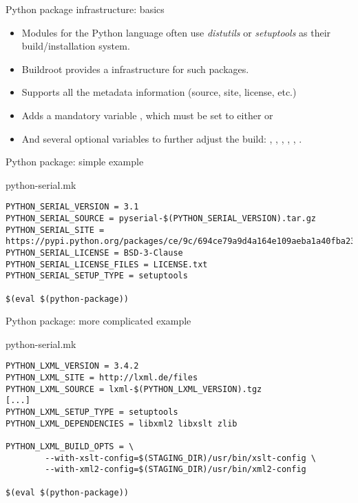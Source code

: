 \begin{frame}{Python package infrastructure: basics}
  \begin{itemize}
  \item Modules for the Python language often use {\em distutils} or
    {\em setuptools} as their build/installation system.
  \item Buildroot provides a  infrastructure for
    such packages.
  \item Supports all the  metadata information
    (source, site, license, etc.)
  \item Adds a mandatory variable , which must
    be set to either  or 
  \item And several optional variables to further adjust the build:
    , ,
    ,
    , ,
    .
  \end{itemize}
\end{frame}

\begin{frame}[fragile]{Python package: simple example}

  \begin{block}{python-serial.mk}
    \begin{verbatim}
PYTHON_SERIAL_VERSION = 3.1
PYTHON_SERIAL_SOURCE = pyserial-$(PYTHON_SERIAL_VERSION).tar.gz
PYTHON_SERIAL_SITE = https://pypi.python.org/packages/ce/9c/694ce79a9d4a164e109aeba1a40fba23336f3b7554978553e22a5d41d54d
PYTHON_SERIAL_LICENSE = BSD-3-Clause
PYTHON_SERIAL_LICENSE_FILES = LICENSE.txt
PYTHON_SERIAL_SETUP_TYPE = setuptools

$(eval $(python-package))
    \end{verbatim}
  \end{block}

\end{frame}

\begin{frame}[fragile]{Python package: more complicated example}
  \begin{block}{python-serial.mk}
    \begin{verbatim}
PYTHON_LXML_VERSION = 3.4.2
PYTHON_LXML_SITE = http://lxml.de/files
PYTHON_LXML_SOURCE = lxml-$(PYTHON_LXML_VERSION).tgz
[...]
PYTHON_LXML_SETUP_TYPE = setuptools
PYTHON_LXML_DEPENDENCIES = libxml2 libxslt zlib

PYTHON_LXML_BUILD_OPTS = \
        --with-xslt-config=$(STAGING_DIR)/usr/bin/xslt-config \
        --with-xml2-config=$(STAGING_DIR)/usr/bin/xml2-config

$(eval $(python-package))
    \end{verbatim}
  \end{block}
\end{frame}

